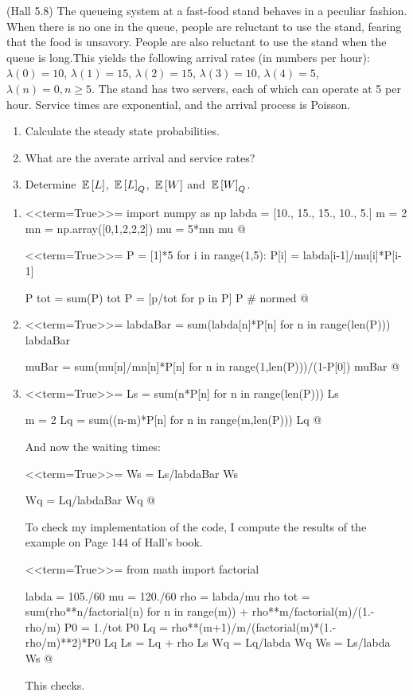 \begin{question}
  (Hall 5.8) The queueing system at a fast-food stand behaves in a
  peculiar fashion. When there is no one in the queue, people are
  reluctant to use the stand, fearing that the food is
  unsavory. People are also reluctant to use the stand when the queue
  is long.This yields the following arrival rates (in numbers per hour): $\lambda(0) = 10$, $\lambda(1)=15$, $\lambda(2)=15$, $\lambda(3)=10$, $\lambda(4)=5$, $\lambda(n)=0, n\geq 5$. The stand has two servers, each of which can operate at 5 per hour. Service times are exponential, and the arrival process is Poisson.
  \begin{enumerate}
  \item Calculate the steady state probabilities.
  \item What are the averate arrival and service rates?
  \item Determine $\,\mathbb{E}\left[L\right]$, $\,\mathbb{E}\left[L\right]_Q$, $\,\mathbb{E}\left[W\right]$ and $\,\mathbb{E}\left[W\right]_Q$.
  \end{enumerate}
  \begin{solution}
      \begin{enumerate}
      \item 

<<term=True>>=
import numpy as np
labda = [10., 15., 15., 10., 5.]
m = 2
mn = np.array([0,1,2,2,2])
mu = 5*mn
mu
@

<<term=True>>=
P = [1]*5
for i in range(1,5):
    P[i] = labda[i-1]/mu[i]*P[i-1]

P
tot = sum(P)
tot
P = [p/tot for p in P]
P # normed
@ 

\item 
<<term=True>>=
labdaBar = sum(labda[n]*P[n] for n in range(len(P)))
labdaBar


muBar = sum(mu[n]/mn[n]*P[n] for n in range(1,len(P)))/(1-P[0])
muBar
@

\item 
<<term=True>>=
Ls = sum(n*P[n] for n in range(len(P)))
Ls

m = 2
Lq = sum((n-m)*P[n] for n in range(m,len(P)))
Lq
@ 

And now the waiting times:

<<term=True>>=
Ws = Ls/labdaBar
Ws

Wq = Lq/labdaBar
Wq
@ 

To check my implementation of the code, I compute the results of the
example on Page 144 of Hall's book.

<<term=True>>=
from math import factorial

labda = 105./60
mu = 120./60
rho = labda/mu
rho
tot = sum(rho**n/factorial(n) for n in range(m)) + rho**m/factorial(m)/(1.-rho/m)
P0 = 1./tot
P0
Lq = rho**(m+1)/m/(factorial(m)*(1.-rho/m)**2)*P0
Lq
Ls = Lq + rho
Ls
Wq = Lq/labda
Wq
Ws = Ls/labda
Ws
@

This checks.
  \end{enumerate}
    \end{solution}
\end{question}

